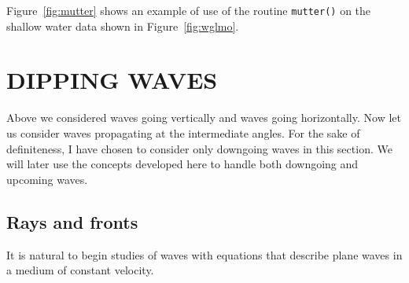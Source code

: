 \par
Figure~\ref{fig:mutter} shows an example of use
of the routine \texttt{mutter()}  on the shallow water data
shown in Figure~\ref{fig:wglmo}.

\section{DIPPING WAVES}

Above we considered waves going vertically
and waves going horizontally.
Now let us consider waves propagating at the intermediate angles.  
For the sake of definiteness, I have chosen
to consider only downgoing waves in this section.
We will later use the concepts developed
here to handle both downgoing and upcoming waves.

\subsection{Rays and fronts}
\par
It is natural to begin studies of waves
with equations that describe plane waves
in a medium of constant velocity.

